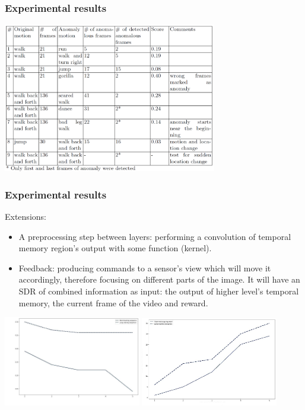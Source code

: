 \documentclass[default]{beamer}
\begin{document}
	\begin{frame}
		\frametitle{Experimental results}
		\centering
		\includegraphics[width=0.7\textwidth]{table-res}
	\end{frame}

	\begin{frame}
		\frametitle{Experimental results}
		Extensions:
		\begin{itemize}
			\item A preprocessing step	between layers: performing a convolution of	temporal memory region's output with some function (kernel).
			\item Feedback: producing commands to a sensor's view which will move it accordingly, therefore focusing on different parts of the image. It will have an SDR of combined
			information as input: the output of higher level's temporal memory, the current
			frame of the video and reward.
		\end{itemize}
		\centering
		\includegraphics[width=0.45\textwidth]{layers-res1}
		\quad
		\includegraphics[width=0.45\textwidth]{layers-res2}
	\end{frame}
\end{document}
